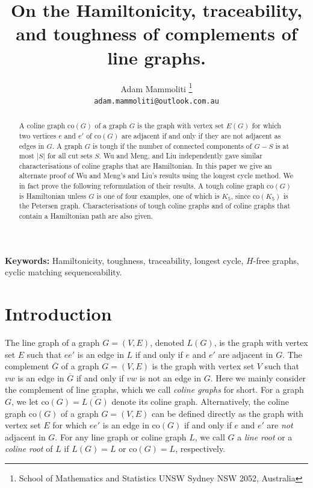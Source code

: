 \documentclass[12pt]{article}
\author{Adam Mammoliti \thanks{
School of Mathematics and Statistics
UNSW Sydney
NSW 2052, Australia
}\\
\texttt{adam.mammoliti@outlook.com.au}
}
\title{On the Hamiltonicity, traceability, and toughness of complements of line graphs. }
\theoremstyle{definition}
\newcommand{\co}{\text{co}}
\begin{document}
\maketitle
\begin{abstract}
A coline graph $\co(G)$ of a graph $G$ is the graph with vertex set $E(G)$ for which two vertices $e$ and $e'$ of $\co(G)$ are adjacent if and only if they are not adjacent as edges in $G$. A graph $G$ is tough if the number of connected components of $G-S$ is at most $|S|$ for all cut sets $S$. Wu and Meng, and Liu independently gave similar characterisations of coline graphs that are Hamiltonian.
In this paper we give an alternate proof of Wu and Meng's and Liu's results using the longest cycle method.  We in fact prove the following reformulation of their results. A tough coline graph $\co(G)$ is Hamiltonian unless $G$ is one of four examples, one of which is $K_5$, since $\co(K_5)$ is the Petersen graph. Characterisations of tough coline graphs and of coline graphs that contain a Hamiltonian path are also given.
\end{abstract}

\bigskip\noindent \textbf{Keywords:}
Hamiltonicity, toughness,  traceability, longest cycle, $H$-free graphs, cyclic matching sequenceability.


\section{Introduction}
The line graph of a graph $G=(V,E)$, denoted $L(G)$, is the graph with vertex set $E$ such that $ee'$ is an edge in $L$ if and only if $e$ and $e'$ are adjacent in $G$. The complement $\overline{G}$ of a graph $G=(V,E)$ is the graph with vertex set $V$ such that $vw$ is an edge in $\overline{G}$ if and only if $vw$ is not an edge in $G$. 
Here we mainly consider the complement of line graphs, which we call {\em coline graphs} for short. For a graph $G$, we let $\co(G) = \overline{L(G)}$ denote its coline graph. Alternatively, the coline graph $\co(G)$ of a graph $G=(V,E)$ can be defined directly as the graph with vertex set $E$ for which $ee'$ is an edge in $\co(G)$ if and only if $e$ and $e'$ are \emph{not} adjacent in $G$. For any line graph or coline graph $L$, we call $G$ a {\em line root} or a {\em coline root} of $L$ if $L(G)=L$ or $\co(G) = L$, respectively.
\end{document}
